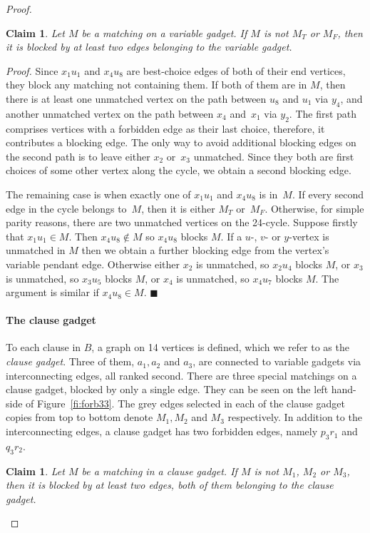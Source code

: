 \documentclass[preprint,12pt]{elsarticle}
\newcommand{\myqed}{$\blacksquare$}
\newcommand{\myproof}{\noindent\textit{Proof. }}
\newtheorem{claim}[theorem]{Claim}
\begin{document}
\begin{proof}
\begin{claim}
\label{cl:var} 
	Let $M$ be a matching on a variable gadget. If $M$ is not $M_T$ or $M_F$, then it is blocked by at least two edges belonging to the variable gadget.
\end{claim}

\myproof Since $x_1u_1$ and $x_4u_8$ are best-choice edges of both of their end vertices, they block any matching not containing them. If both of them are in $M$, then there is at least one unmatched vertex on the path between $u_8$ and $u_1$ via $y_4$, and another unmatched vertex on the path between $x_4$ and~$x_1$ via $y_2$. The first path comprises vertices with a forbidden edge as their last choice, therefore, it contributes a blocking edge. The only way to avoid additional blocking edges on the second path is to leave either $x_2$ or~$x_3$ unmatched. Since they both are first choices of some other vertex along the cycle, we obtain a second blocking edge.

The remaining case is when exactly one of $x_1u_1$ and $x_4u_8$ is in~$M$. If every second edge in the cycle belongs to~$M$, then it is either $M_T$ or~$M_F$. Otherwise, for simple parity reasons, there are two unmatched vertices on the 24-cycle.  Suppose firstly that $x_1u_1\in M$.  Then $x_4u_8\notin M$ so $x_4u_8$ blocks $M$.  If a $u$-, $v$- or $y$-vertex is unmatched in $M$ then we obtain a further blocking edge from the vertex's variable pendant edge.  Otherwise either $x_2$ is unmatched, so $x_2u_4$ blocks $M$, or $x_3$ is unmatched, so $x_3u_5$ blocks $M$, or $x_4$ is unmatched, so $x_4u_7$ blocks $M$.  The argument is similar if $x_4u_8\in M$. \myqed
	
\paragraph{The clause gadget} To each clause in $B$, a graph on 14 vertices is defined, which we refer to as the \emph{clause gadget}. Three of them, $a_1, a_2$ and $a_3$, are connected to variable gadgets via interconnecting edges, all ranked second. There are three special matchings on a clause gadget, blocked by only a single edge. They can be seen on the left hand-side of Figure~\ref{fi:forb33}. The grey edges selected in each of the clause gadget copies from top to bottom denote $M_1, M_2$ and $M_3$ respectively. 
In addition to the interconnecting edges, a clause gadget has two forbidden edges, namely $p_3r_1$ and $q_3r_2$.
\begin{claim}
\label{cl:clause} 
	Let $M$ be a matching in a clause gadget. If $M$ is not $M_1$, $M_2$ or $M_3$, then it is blocked by at least two edges, both of them belonging to the clause gadget. 
\end{claim}


\end{proof}
\end{document}
